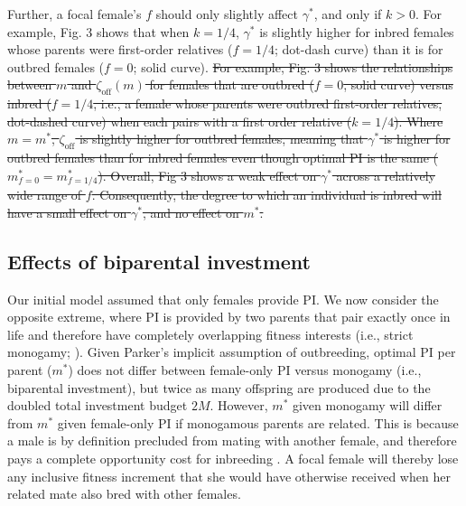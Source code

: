 \documentclass[12pt]{article}
\begin{document}
Further, a focal female's $f$ should only slightly affect $\gamma^{*}$, and only if $k>0$. {\color{blue}For example, Fig. 3 shows that when $k=1/4$, $\gamma^{*}$ is slightly higher for inbred females whose parents were first-order relatives ($f=1/4$; dot-dash curve) than it is for outbred females ($f=0$; solid curve).} {\color{red}\st{For example, Fig. 3 shows the relationships between $m$ and $\zeta_{\textrm{off}}(m)$ for females that are outbred ($f=0$, solid curve) versus inbred ($f=1/4$, i.e., a female whose parents were outbred first-order relatives, dot-dashed curve) when each pairs with a first order relative ($k=1/4$). Where $m=m^{*}$, $\zeta_{\textrm{off}}$ is slightly higher for outbred females, meaning that $\gamma^{*}$ is higher for outbred females than for inbred females even though optimal PI is the same ($m^{*}_{f=0}=m^{*}_{f=1/4}$). Overall, Fig 3 shows a weak effect on $\gamma^{*}$ across a relatively wide range of $f$. Consequently, the degree to which an individual is inbred will have a small effect {\color{blue}on} $\gamma^{*}$, and no effect on $m^{*}$.}}

\subsection*{Effects of biparental investment}

Our initial model assumed that only females provide PI. We now consider the opposite extreme, where PI is provided by two parents that pair exactly once in life and therefore have completely overlapping fitness interests (i.e., strict monogamy; \cite{Parker1985}). Given Parker's \cite{Parker1985} implicit assumption of outbreeding, optimal PI per parent ($m^{*}$) does not differ between female-only PI versus monogamy (i.e., biparental investment), but twice as many offspring are produced due to the doubled total investment budget $2M$. However, $m^{*}$ given monogamy will differ from $m^{*}$ given female-only PI if monogamous parents are related. This is because a male is by definition precluded from mating with another female, and therefore pays a complete opportunity cost for inbreeding \cite[][]{Waser1986}. A focal female will thereby lose any inclusive fitness increment that she would have otherwise received when her related mate also bred with other females.
\end{document}
